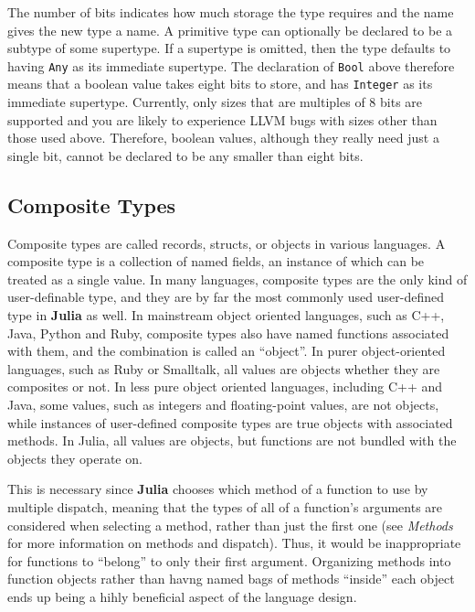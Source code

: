 \documentclass[
]{article}
\begin{document}
The number of bits indicates how much storage the type requires and the
name gives the new type a name. A primitive type can optionally be
declared to be a subtype of some supertype. If a supertype is omitted,
then the type defaults to having \texttt{Any} as its immediate
supertype. The declaration of \texttt{Bool} above therefore means that a
boolean value takes eight bits to store, and has \texttt{Integer} as its
immediate supertype. Currently, only sizes that are multiples of 8 bits
are supported and you are likely to experience LLVM bugs with sizes
other than those used above. Therefore, boolean values, although they
really need just a single bit, cannot be declared to be any smaller than
eight bits.

\hypertarget{composite-types}{%
\subsection{Composite Types}\label{composite-types}}

Composite types are called records, structs, or objects in various
languages. A composite type is a collection of named fields, an instance
of which can be treated as a single value. In many languages, composite
types are the only kind of user-definable type, and they are by far the
most commonly used user-defined type in \textbf{Julia} as well. In
mainstream object oriented languages, such as C++, Java, Python and
Ruby, composite types also have named functions associated with them,
and the combination is called an ``object''. In purer object-oriented
languages, such as Ruby or Smalltalk, all values are objects whether
they are composites or not. In less pure object oriented languages,
including C++ and Java, some values, such as integers and floating-point
values, are not objects, while instances of user-defined composite types
are true objects with associated methods. In Julia, all values are
objects, but functions are not bundled with the objects they operate on.

This is necessary since \textbf{Julia} chooses which method of a
function to use by multiple dispatch, meaning that the types of all of a
function's arguments are considered when selecting a method, rather than
just the first one (see \emph{Methods} for more information on methods
and dispatch). Thus, it would be inappropriate for functions to
``belong'' to only their first argument. Organizing methods into
function objects rather than havng named bags of methods ``inside'' each
object ends up being a hihly beneficial aspect of the language design.
\end{document}
